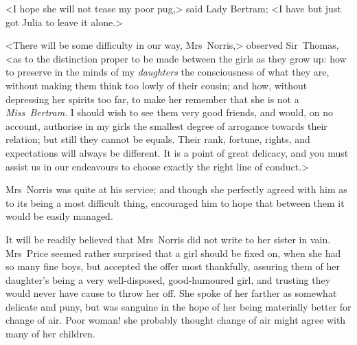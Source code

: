 <I hope she will not tease my poor pug,> said Lady Bertram; <I have but just got Julia to leave it alone.>

<There will be some difficulty in our way, Mrs~Norris,> observed Sir~Thomas, <as to the distinction proper to be made between the girls as they grow up: how to preserve in the minds of my \textit{daughters}  the consciousness of what they are, without making them think too lowly of their cousin; and how, without depressing her spirits too far, to make her remember that she is not a \textit{Miss~Bertram}. I should wish to see them very good friends, and would, on no account, authorise in my girls the smallest degree of arrogance towards their relation; but still they cannot be equals. Their rank, fortune, rights, and expectations will always be different. It is a point of great delicacy, and you must assist us in our endeavours to choose exactly the right line of conduct.>

Mrs~Norris was quite at his service; and though she perfectly agreed with him as to its being a most difficult thing, encouraged him to hope that between them it would be easily managed.

It will be readily believed that Mrs~Norris did not write to her sister in vain. Mrs~Price seemed rather surprised that a girl should be fixed on, when she had so many fine boys, but accepted the offer most thankfully, assuring them of her daughter's being a very well-disposed, good-humoured girl, and trusting they would never have cause to throw her off. She spoke of her farther as somewhat delicate and puny, but was sanguine in the hope of her being materially better for change of air. Poor woman! she probably thought change of air might agree with many of her children. 